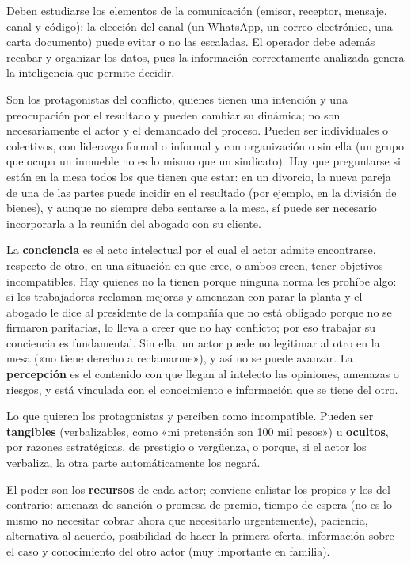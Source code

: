 \documentclass[12pt,oneside]{book}
\begin{document}
\begin{description}[leftmargin=0pt,style=nextline]
\item[Comunicación e información.] Deben estudiarse los elementos de la comunicación (emisor, receptor, mensaje, canal y código): la elección del canal (un WhatsApp, un correo electrónico, una carta documento) puede evitar o no las escaladas. El operador debe además recabar y organizar los datos, pues la información correctamente analizada genera la inteligencia que permite decidir.
\item[Los actores.] Son los protagonistas del conflicto, quienes tienen una intención y una preocupación por el resultado y pueden cambiar su dinámica; no son necesariamente el actor y el demandado del proceso. Pueden ser individuales o colectivos, con liderazgo formal o informal y con organización o sin ella (un grupo que ocupa un inmueble no es lo mismo que un sindicato). Hay que preguntarse si están en la mesa todos los que tienen que estar: en un divorcio, la nueva pareja de una de las partes puede incidir en el resultado (por ejemplo, en la división de bienes), y aunque no siempre deba sentarse a la mesa, sí puede ser necesario incorporarla a la reunión del abogado con su cliente.
\item[Conciencia y percepción.] La \textbf{conciencia} es el acto intelectual por el cual el actor admite encontrarse, respecto de otro, en una situación en que cree, o ambos creen, tener objetivos incompatibles. Hay quienes no la tienen porque ninguna norma les prohíbe algo: si los trabajadores reclaman mejoras y amenazan con parar la planta y el abogado le dice al presidente de la compañía que no está obligado porque no se firmaron paritarias, lo lleva a creer que no hay conflicto; por eso trabajar su conciencia es fundamental. Sin ella, un actor puede no legitimar al otro en la mesa («no tiene derecho a reclamarme»), y así no se puede avanzar. La \textbf{percepción} es el contenido con que llegan al intelecto las opiniones, amenazas o riesgos, y está vinculada con el conocimiento e información que se tiene del otro.
\item[Los objetivos.] Lo que quieren los protagonistas y perciben como incompatible. Pueden ser \textbf{tangibles} (verbalizables, como «mi pretensión son 100 mil pesos») u \textbf{ocultos}, por razones estratégicas, de prestigio o vergüenza, o porque, si el actor los verbaliza, la otra parte automáticamente los negará.
\item[Las relaciones de poder.] El poder son los \textbf{recursos} de cada actor; conviene enlistar los propios y los del contrario: amenaza de sanción o promesa de premio, tiempo de espera (no es lo mismo no necesitar cobrar ahora que necesitarlo urgentemente), paciencia, alternativa al acuerdo, posibilidad de hacer la primera oferta, información sobre el caso y conocimiento del otro actor (muy importante en familia).

\end{description}
\end{document}
